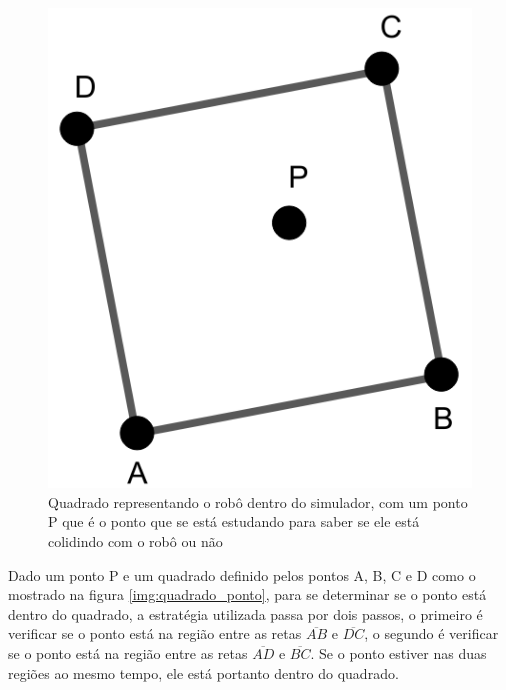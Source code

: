 \begin{alineas}[leftmargin=0pt, itemindent=20pt, labelwidth=15pt, labelsep=5pt, listparindent=1.25cm, align=left]
     \begin{figure}[!htb]
        \caption{\label{img:quadrado_ponto}Quadrado representando o robô dentro do simulador, com um ponto P que é o ponto que se está estudando para saber se ele está colidindo com o robô ou não}
    	\begin{center}
            \includegraphics[scale=0.45]{img/quadrado_ponto.png}
    	\end{center}
    \end{figure}
     
    Dado um ponto P e um quadrado definido pelos pontos A, B, C e D como o mostrado na figura \autoref{img:quadrado_ponto}, para se determinar se o ponto está dentro do quadrado, a estratégia utilizada passa por dois passos, o primeiro é verificar se o ponto está na região entre as retas $\overline{AB}$ e $\overline{DC}$, o segundo é verificar se o ponto está na região entre as retas $\overline{AD}$ e $\overline{BC}$. Se o ponto estiver nas duas regiões ao mesmo tempo, ele está portanto dentro do quadrado.
    

\end{alineas}
